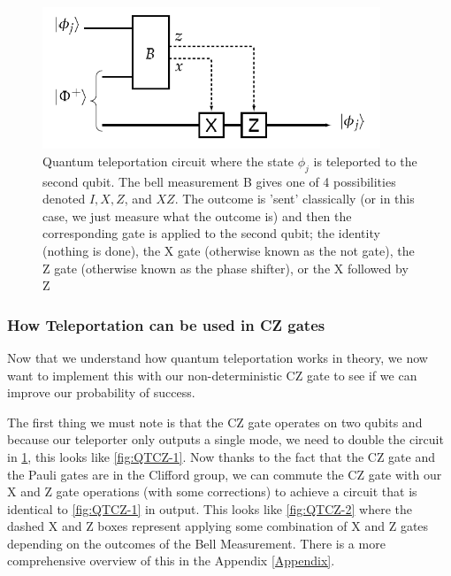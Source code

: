 \begin{figure}[h]
    \centering
    \includegraphics[width=0.9\textwidth]{images/QT circuit.png}
    \caption{Quantum teleportation circuit where the state $\phi_j$ is teleported to the second qubit. The bell measurement B gives one of 4 possibilities denoted $I, X, Z$, and $XZ$. The outcome is 'sent' classically (or in this case, we just measure what the outcome is) and then the corresponding gate is applied to the second qubit; the identity (nothing is done), the X gate (otherwise known as the not gate), the Z gate (otherwise known as the phase shifter), or the X followed by Z}\label{fig:QT circuit}
\end{figure}

\subsubsection{How Teleportation can be used in CZ gates}
Now that we understand how quantum teleportation works in theory, we now want to implement this with our non-deterministic CZ gate to see if we can improve our probability of success.

The first thing we must note is that the CZ gate operates on two qubits and because our teleporter only outputs a single mode, we need to double the circuit in \cref{fig:QT circuit}, this looks like \cref{fig:QTCZ-1}. Now thanks to the fact that the CZ gate and the Pauli gates are in the Clifford group, we can commute the CZ gate with our X and Z gate operations (with some corrections) to achieve a circuit that is identical to \cref{fig:QTCZ-1} in output. This looks like \cref{fig:QTCZ-2} where the dashed X and Z boxes represent applying some combination of X and Z gates depending on the outcomes of the Bell Measurement. There is a more comprehensive overview of this in the Appendix \ref{Appendix}. 

